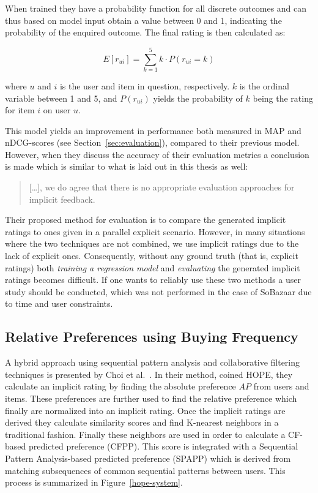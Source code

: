 When trained they have a probability function for all discrete outcomes and can
thus based on model input obtain a value between 0 and 1, indicating the
probability of the enquired outcome. The final rating is then calculated as:

\begin{equation}
  E[r_{ui}] = \sum_{k=1}^{5} k \cdot P(r_{ui} = k)
\end{equation}

where $u$ and $i$ is the user and item in question, respectively. $k$ is the
ordinal variable between 1 and 5, and $P(r_{ui})$ yields the probability of $k$
being the rating for item $i$ on user $u$.

This model yields an improvement in performance both measured in MAP and
nDCG-scores (see Section~\ref{sec:evaluation}), compared to their previous model. However,
when they discuss the accuracy of their evaluation metrics a conclusion is made
which is similar to what is laid out in this thesis as well:

\begin{quotation}
  [\dots], we do agree that there is no appropriate evaluation approaches for
  implicit feedback.
\end{quotation}

Their proposed method for evaluation is to compare the generated implicit
ratings to ones given in a parallel explicit scenario. However, in many
situations where the two techniques are not combined, we use implicit ratings
due to the lack of explicit ones. Consequently, without any ground truth (that
is, explicit ratings) both \textit{training a regression model} and
\textit{evaluating} the generated implicit ratings becomes difficult. If one
wants to reliably use these two methods a user study should be conducted, which
was not performed in the case of SoBazaar due to time and user constraints.

\subsection{Relative Preferences using Buying Frequency}
A hybrid approach using sequential pattern analysis and collaborative filtering
techniques is presented by Choi et al.~\cite{choi2012hybrid}. In their
method, coined HOPE, they calculate an implicit rating by finding the
absolute preference $AP$ from users and items. These preferences are further
used to find the relative preference which finally are normalized into an
implicit rating. Once the implicit ratings are derived they calculate
similarity scores and find K-nearest neighbors in a traditional fashion.
Finally these neighbors are used in order to calculate a CF-based predicted
preference (CFPP). This score is integrated with a Sequential Pattern
Analysis-based predicted preference (SPAPP) which is derived from matching
subsequences of common sequential patterns between users. This process is
summarized in Figure~\ref{hope-system}.

